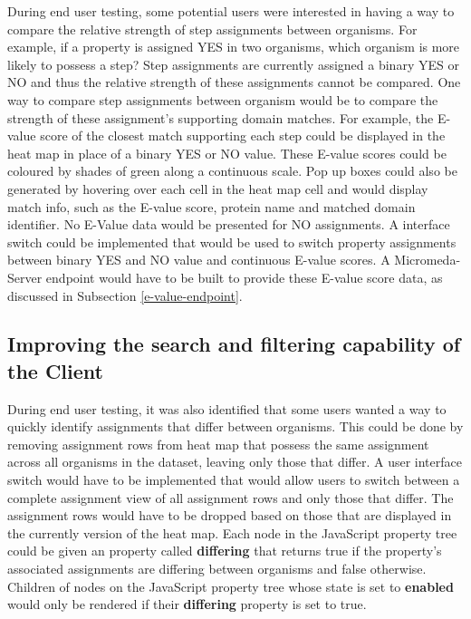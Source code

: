 During end user testing, some potential users were interested in having a way to compare the relative strength of step assignments between organisms. For example, if a property is assigned YES in two organisms, which organism is more likely to possess a step? Step assignments are currently assigned a binary YES or NO and thus the relative strength of these assignments cannot be compared. One way to compare step assignments between organism would be to compare the strength of these assignment's supporting domain matches. For example, the E-value score of the closest match supporting each step could be displayed in the heat map in place of a binary YES or NO value. These E-value scores could be coloured by shades of green along a continuous scale. Pop up boxes could also be generated by hovering over each cell in the heat map cell and would display match info, such as the E-value score, protein name and matched domain identifier. No E-Value data would be presented for NO assignments. A interface switch could be implemented that would be used to switch property assignments between binary YES and NO value and continuous E-value scores. A Micromeda-Server endpoint would have to be built to provide these E-value score data, as discussed in Subsection \ref{e-value-endpoint}.

\subsection{Improving the search and filtering capability of the Client}

During end user testing, it was also identified that some users wanted a way to quickly identify assignments that differ between organisms. This could be done by removing assignment rows from heat map that possess the same assignment across all organisms in the dataset, leaving only those that differ. A user interface switch would have to be implemented that would allow users to switch between a complete assignment view of all assignment rows and only those that differ. The assignment rows would have to be dropped based on those that are displayed in the currently version of the heat map. Each node in the JavaScript property tree could be given an property called \textbf{differing} that returns true if the property's associated assignments are differing between organisms and false otherwise. Children of nodes on the JavaScript property tree whose state is set to \textbf{enabled} would only be rendered if their  \textbf{differing} property is set to true.

